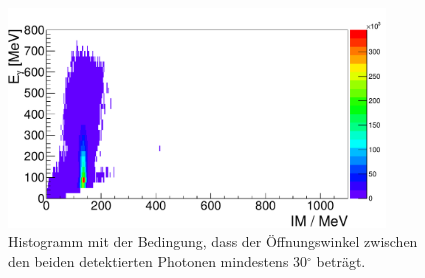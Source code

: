 \documentclass[a4paper,11pt,oneside,final,german,openbib,pdftex]{scrbook}
\begin{document}
{\begin{appendix}
\begin{figure}[h!]
	\begin{center}
		\includegraphics[width=100mm]{NewCalib/20171904SimMinOpeningAngleHist}
		\caption[Simulation: 2D-Hist \"Offnungswinkel $>$ 30$^{\circ}$]{Histogramm mit der Bedingung, dass der \"Offnungswinkel zwischen den beiden detektierten Photonen mindestens 30$^\circ$ betr\"agt.}
	\end{center}
\end{figure}

\end{appendix}}
\end{document}
